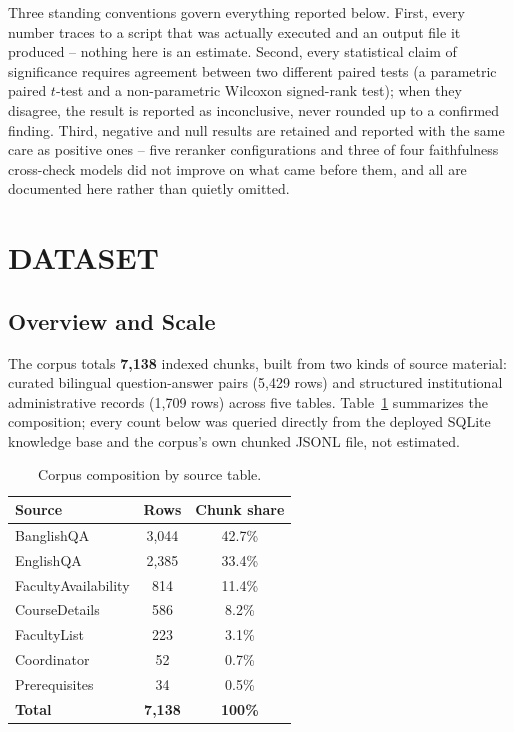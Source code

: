 \documentclass[a4paper,twoside]{article}
\begin{document}
Three standing conventions govern everything reported below. First, every number traces to a script that was actually executed and an output file it produced -- nothing here is an estimate. Second, every statistical claim of significance requires agreement between two different paired tests (a parametric paired $t$-test and a non-parametric Wilcoxon signed-rank test); when they disagree, the result is reported as inconclusive, never rounded up to a confirmed finding. Third, negative and null results are retained and reported with the same care as positive ones -- five reranker configurations and three of four faithfulness cross-check models did not improve on what came before them, and all are documented here rather than quietly omitted.

\section{\uppercase{Dataset}}
\label{sec:dataset}

\subsection{Overview and Scale}
\label{subsec:dataset-overview}

The corpus totals \textbf{7{,}138} indexed chunks, built from two kinds of source material: curated bilingual question-answer pairs (5{,}429 rows) and structured institutional administrative records (1{,}709 rows) across five tables. Table~\ref{tab:dataset-overview} summarizes the composition; every count below was queried directly from the deployed SQLite knowledge base and the corpus's own chunked JSONL file, not estimated.

\begin{table}[h]
\caption{Corpus composition by source table.}\label{tab:dataset-overview}\centering
\begin{tabular}{|l|c|c|}
\hline
Source & Rows & Chunk share \\
\hline
BanglishQA & 3{,}044 & 42.7\% \\
EnglishQA & 2{,}385 & 33.4\% \\
FacultyAvailability & 814 & 11.4\% \\
CourseDetails & 586 & 8.2\% \\
FacultyList & 223 & 3.1\% \\
Coordinator & 52 & 0.7\% \\
Prerequisites & 34 & 0.5\% \\
\hline
\textbf{Total} & \textbf{7{,}138} & \textbf{100\%} \\
\hline
\end{tabular}
\end{table}
\end{document}
